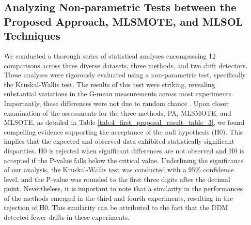 \begin{table}[h!]
  \centering
  \caption{Runtime of MLSMOTE, MLSOL, and the Proposed Approach (PA).}
  \label{tab:4_first_proposal_result_table_2}
  \end{table}

\subsection{Analyzing Non-parametric Tests between the Proposed Approach, MLSMOTE, and MLSOL Techniques}
We conducted a thorough series of statistical analyses encompassing 12 comparisons across three diverse datasets, three methods, and two drift detectors. These analyses were rigorously evaluated using a non-parametric test, specifically the Kruskal-Wallis test. The results of this test were striking, revealing substantial variations in the G-mean measurements across most experiments. Importantly, these differences were not due to random chance \cite{yamada2013change}. Upon closer examination of the assessments for the three methods, PA, MLSMOTE, and MLSOTE, as detailed in Table \ref{tab:4_first_proposal_result_table_3}, we found compelling evidence supporting the acceptance of the null hypothesis (H0).
This implies that the expected and observed data exhibited statistically significant disparities. H0 is rejected when significant differences are not observed and H0 is accepted if the P-value falls below the critical value. Underlining the significance of our analysis, the Kruskal-Wallis test was conducted with a 95\% confidence level, and the P-value was rounded to the first three digits after the decimal point. Nevertheless, it is important to note that a similarity in the performances of the methods emerged in the third and fourth experiments, resulting in the rejection of H0. This similarity can be attributed to the fact that the DDM detected fewer drifts in these experiments.


